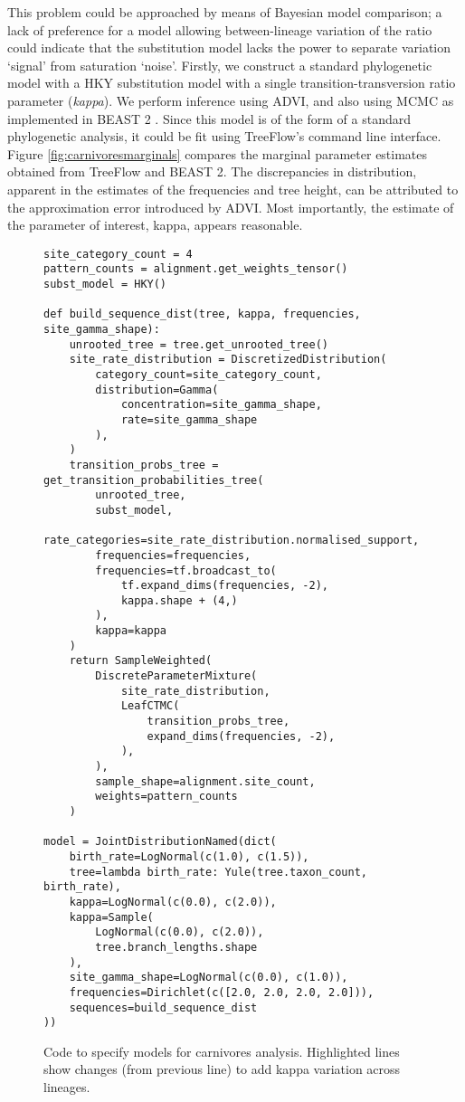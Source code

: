 This problem could be approached by means of Bayesian model comparison; a lack of preference for a model allowing between-lineage variation of the ratio could indicate that the substitution model lacks the power to separate variation `signal' from saturation `noise'. Firstly, we construct a standard phylogenetic model with a HKY substitution model with a single transition-transversion ratio parameter (\textit{kappa}). We perform inference using ADVI, and also using MCMC as implemented in BEAST 2 \cite{bouckaert2019beast}. Since this model is of the form of a standard phylogenetic analysis, it could be fit using TreeFlow's command line interface. Figure \ref{fig:carnivoresmarginals} compares the marginal parameter estimates obtained from TreeFlow and BEAST 2. The discrepancies in distribution, apparent in the estimates of the frequencies and tree height, can be attributed to the approximation error introduced by ADVI. Most importantly, the estimate of the parameter of interest, kappa, appears reasonable.

\begin{figure}
    \begin{verbatim}
site_category_count = 4
pattern_counts = alignment.get_weights_tensor()
subst_model = HKY()

def build_sequence_dist(tree, kappa, frequencies, site_gamma_shape):
    unrooted_tree = tree.get_unrooted_tree()
    site_rate_distribution = DiscretizedDistribution(
        category_count=site_category_count,
        distribution=Gamma(
            concentration=site_gamma_shape,
            rate=site_gamma_shape
        ),
    )
    transition_probs_tree = get_transition_probabilities_tree(
        unrooted_tree,
        subst_model,
        rate_categories=site_rate_distribution.normalised_support,
        frequencies=frequencies,
        frequencies=tf.broadcast_to(
            tf.expand_dims(frequencies, -2),
            kappa.shape + (4,)
        ),
        kappa=kappa
    )
    return SampleWeighted(
        DiscreteParameterMixture(
            site_rate_distribution,
            LeafCTMC(
                transition_probs_tree,
                expand_dims(frequencies, -2),
            ),
        ),
        sample_shape=alignment.site_count,
        weights=pattern_counts
    )

model = JointDistributionNamed(dict(
    birth_rate=LogNormal(c(1.0), c(1.5)),
    tree=lambda birth_rate: Yule(tree.taxon_count, birth_rate),
    kappa=LogNormal(c(0.0), c(2.0)),
    kappa=Sample(
        LogNormal(c(0.0), c(2.0)),
        tree.branch_lengths.shape
    ),
    site_gamma_shape=LogNormal(c(0.0), c(1.0)),
    frequencies=Dirichlet(c([2.0, 2.0, 2.0, 2.0])),
    sequences=build_sequence_dist
))
    \end{verbatim}
    \label{fig:carnivorescode}
    \caption{Code to specify models for carnivores analysis. Highlighted lines show changes (from previous line) to add kappa variation across lineages.}
\end{figure}

